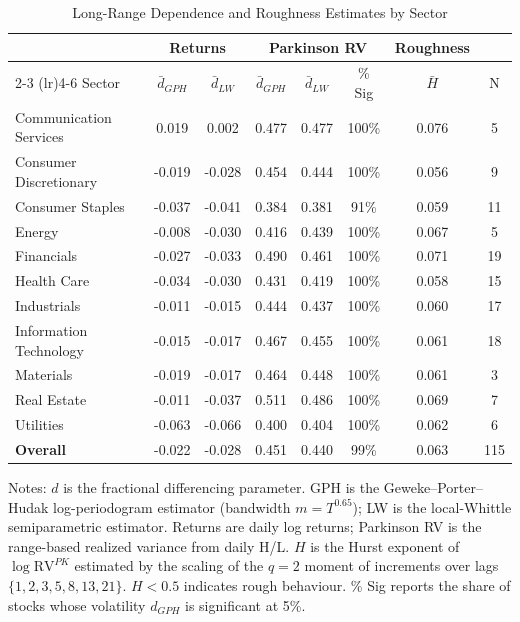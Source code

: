 
\begin{table}[htbp]
\centering
\caption{Long-Range Dependence and Roughness Estimates by Sector}
\label{tab:lrd_estimates}
\small
\begin{tabular}{lccccccc}
\toprule
 & \multicolumn{2}{c}{Returns} & \multicolumn{3}{c}{Parkinson RV} & Roughness & \\
\cmidrule(lr){2-3} \cmidrule(lr){4-6}
Sector & $\bar d_{GPH}$ & $\bar d_{LW}$ & $\bar d_{GPH}$ & $\bar d_{LW}$ & \% Sig & $\bar H$ & N \\
\midrule
Communication Services & 0.019 & 0.002 & 0.477 & 0.477 & 100\% & 0.076 & 5 \\
Consumer Discretionary & -0.019 & -0.028 & 0.454 & 0.444 & 100\% & 0.056 & 9 \\
Consumer Staples & -0.037 & -0.041 & 0.384 & 0.381 & 91\% & 0.059 & 11 \\
Energy & -0.008 & -0.030 & 0.416 & 0.439 & 100\% & 0.067 & 5 \\
Financials & -0.027 & -0.033 & 0.490 & 0.461 & 100\% & 0.071 & 19 \\
Health Care & -0.034 & -0.030 & 0.431 & 0.419 & 100\% & 0.058 & 15 \\
Industrials & -0.011 & -0.015 & 0.444 & 0.437 & 100\% & 0.060 & 17 \\
Information Technology & -0.015 & -0.017 & 0.467 & 0.455 & 100\% & 0.061 & 18 \\
Materials & -0.019 & -0.017 & 0.464 & 0.448 & 100\% & 0.061 & 3 \\
Real Estate & -0.011 & -0.037 & 0.511 & 0.486 & 100\% & 0.069 & 7 \\
Utilities & -0.063 & -0.066 & 0.400 & 0.404 & 100\% & 0.062 & 6 \\
\midrule
\textbf{Overall} & -0.022 & -0.028 & 0.451 & 0.440 & 99\% & 0.063 & 115 \\
\bottomrule
\end{tabular}
\begin{tablenotes}\small
\item Notes: $d$ is the fractional differencing parameter. GPH is the Geweke--Porter--Hudak log-periodogram estimator (bandwidth $m = T^{0.65}$); LW is the local-Whittle semiparametric estimator. Returns are daily log returns; Parkinson RV is the range-based realized variance from daily H/L. $H$ is the Hurst exponent of $\log\mathrm{RV}^{PK}$ estimated by the scaling of the $q=2$ moment of increments over lags $\{1,2,3,5,8,13,21\}$. $H<0.5$ indicates rough behaviour. \% Sig reports the share of stocks whose volatility $d_{GPH}$ is significant at 5\%.
\end{tablenotes}
\end{table}

